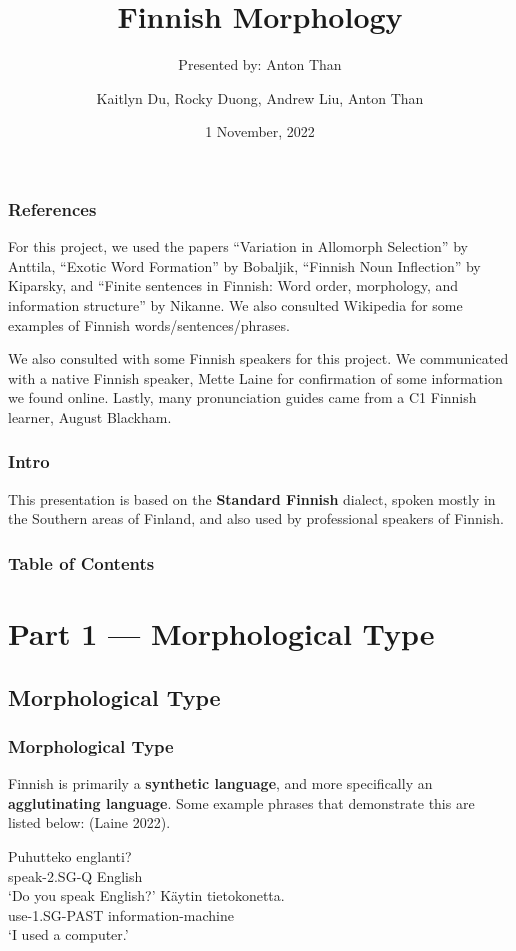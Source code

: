 \documentclass{beamer}
\title[Project Presentation] %
{Finnish Morphology}
\subtitle{Presented by: Anton Than}
\author{Kaitlyn Du, Rocky Duong, Andrew Liu, Anton Than}
\date {1 November, 2022}
\begin{document}
\renewcommand\thefootnote{\relax}

\frame{\titlepage}

\begin{frame}
	\frametitle{References}
	For this project, we used the papers ``Variation in Allomorph Selection'' by Anttila, ``Exotic Word Formation'' by Bobaljik, ``Finnish Noun Inflection'' by Kiparsky, and ``Finite sentences in Finnish: Word order, morphology, and information structure'' by Nikanne. We also consulted Wikipedia for some examples of Finnish words/sentences/phrases.

	We also consulted with some Finnish speakers for this project. We communicated with a native Finnish speaker, Mette Laine for confirmation of some information we found online. Lastly, many pronunciation guides came from a C1 Finnish learner, August Blackham.
\end{frame}

\begin{frame}
	\frametitle{Intro}
	{\large This presentation is based on the \textbf{Standard Finnish} dialect, spoken mostly in the Southern areas of Finland, and also used by professional speakers of Finnish.}
\end{frame}

\begin{frame}
\frametitle{Table of Contents}
\tableofcontents
\end{frame}

\section{Part 1 --- Morphological Type}

\subsection{Morphological Type}

\begin{frame}
	\frametitle{Morphological Type}
     \begin{center}
         Finnish is primarily a \textbf{synthetic language}, and more specifically an \textbf{agglutinating language}. Some example phrases that demonstrate this are listed below: (Laine 2022).
     \end{center}
     
     \begin{exe}
         \ex
         \gll Puhutteko englanti?\\
         {speak-2.SG-Q} {English}\\
         \glt `Do you speak English?'
         \ex
         \gll K\"aytin tietokonetta.\\
         {use-1.SG-PAST} {information-machine}\\
         \glt `I used a computer.'
     \end{exe}

\end{frame}
\end{document}
